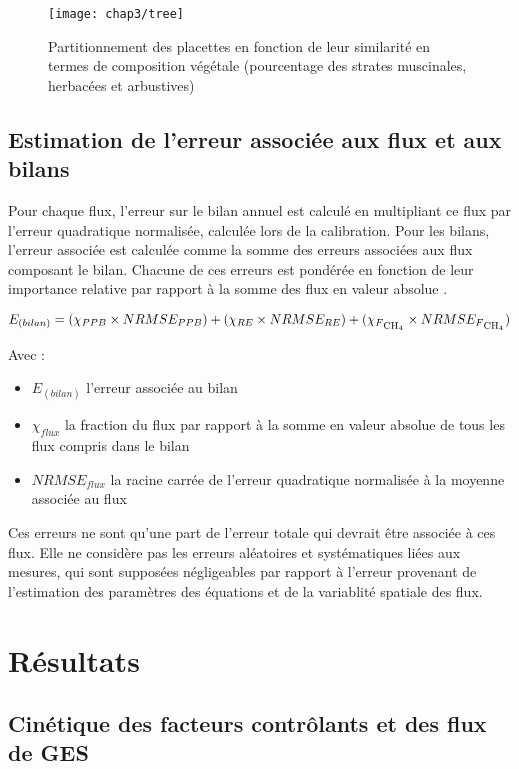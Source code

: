 \begin{figure}[t]
\centering
\texttt{[image: chap3/tree]}
\caption{Partitionnement des placettes en fonction de leur similarité en termes de composition végétale (pourcentage des strates muscinales, herbacées et arbustives)}
\label{fig:tree}
\end{figure}


\subsection{Estimation de l'erreur associée aux flux et aux bilans}
\label{subsec:erreur_bilan}

Pour chaque flux, l'erreur sur le bilan annuel est calculé en multipliant ce flux par l'erreur quadratique normalisée, calculée lors de la calibration.
Pour les bilans, l'erreur associée est calculée comme la somme des erreurs associées aux flux composant le bilan.
Chacune de ces erreurs est pondérée en fonction de leur importance relative par rapport à la somme des flux en valeur absolue \citep{waddington2000}.

\begin{equation}
E_{(bilan)} = (\chi_{PPB} \times NRMSE_{PPB}) + (\chi_{RE} \times NRMSE_{RE}) + (\chi_{F\textsubscript{CH\textsubscript{4}}} \times NRMSE_{F\textsubscript{CH\textsubscript{4}}})
\end{equation}

Avec : 
\begin{itemize}
\item $E_{(bilan)}$ l'erreur associée au bilan
\item $\chi_{flux}$ la fraction du flux par rapport à la somme en valeur absolue de tous les flux compris dans le bilan
\item $NRMSE_{flux}$ la racine carrée de l'erreur quadratique normalisée à la moyenne associée au flux
\end{itemize}

Ces erreurs ne sont qu'une part de l'erreur totale qui devrait être associée à ces flux. Elle ne considère pas les erreurs aléatoires et systématiques liées aux mesures, qui sont supposées négligeables par rapport à l'erreur provenant de l'estimation des paramètres des équations et de la variablité spatiale des flux.


\section{Résultats}

\subsection{Cinétique des facteurs contrôlants et des flux de GES}


